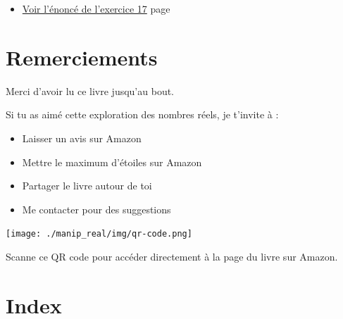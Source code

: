 \documentclass[a4paper,11pt]{book}
\begin{document}
\begin{itemize}
\item \hyperref[org4f79895]{Voir l'énoncé de l'exercice 17}
page~\pageref{page:sec3.5.1exo17}
\end{itemize}

\part{Remerciements}
\label{sec:orgc32fb54}

Merci d’avoir lu ce livre jusqu’au bout.

Si tu as aimé cette exploration des nombres réels, je t’invite à :
\begin{itemize}
\item Laisser un avis sur Amazon
\item Mettre le maximum d'étoiles sur Amazon
\item Partager le livre autour de toi
\item Me contacter pour des suggestions
\end{itemize}

\begin{center}
\texttt{[image: ./manip\_real/img/qr-code.png]}
\end{center}

Scanne ce QR code pour accéder directement à la page du livre sur Amazon.
\part{Index}
\label{sec:org01bac78}
\printindex


\printglossaries
\printglossary[type=\acronymtype]
\end{document}
